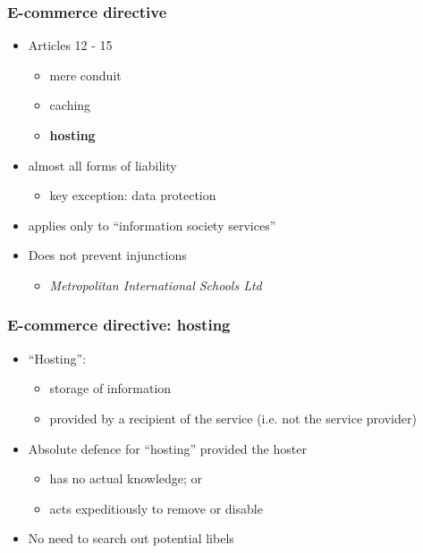 \documentclass[ignorenonframetext,]{beamer}
\begin{document}
\begin{frame}
\frametitle{E-commerce directive}

\begin{itemize}
\item  Articles 12 - 15
  \begin{itemize}
  \item mere conduit
  \item caching
  \item {\bf hosting}
  \end{itemize}

  \item almost all forms of liability
    \begin{itemize}
    \item key exception: data protection
    \end{itemize}
  \item applies only to ``information society services''
\item  Does not prevent injunctions

  \begin{itemize}
  \item    {\it Metropolitan International Schools Ltd}
  \end{itemize}

\end{itemize}

\end{frame}

\begin{frame}
  \frametitle{E-commerce directive: hosting}
  \begin{itemize}
  \item ``Hosting'':
    \begin{itemize}
    \item storage of information
    \item provided by a recipient of the service (i.e. not the service provider)
    \end{itemize}
  \item Absolute defence for ``hosting'' provided the hoster
    \begin{itemize}
    \item has no actual knowledge; or
    \item acts expeditiously to remove or disable
    \end{itemize}
  \item  {No need to search out potential libels}
  \end{itemize}
  
\end{frame}
\end{document}
